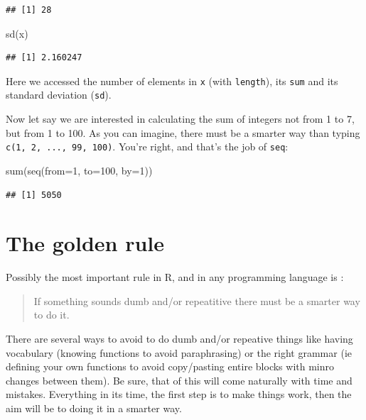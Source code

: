 \documentclass[
]{book}
\newenvironment{Shaded}{\begin{snugshade}}{\end{snugshade}}
\newcommand{\AttributeTok}[1]{\textcolor[rgb]{0.77,0.63,0.00}{#1}}
\newcommand{\DecValTok}[1]{\textcolor[rgb]{0.00,0.00,0.81}{#1}}
\newcommand{\FunctionTok}[1]{\textcolor[rgb]{0.00,0.00,0.00}{#1}}
\newcommand{\NormalTok}[1]{#1}
\begin{document}
\begin{verbatim}
## [1] 28
\end{verbatim}

\begin{Shaded}
\begin{Highlighting}[]
\FunctionTok{sd}\NormalTok{(x)}
\end{Highlighting}
\end{Shaded}

\begin{verbatim}
## [1] 2.160247
\end{verbatim}

Here we accessed the number of elements in \texttt{x} (with \texttt{length}), its \texttt{sum} and its standard deviation (\texttt{sd}).

Now let say we are interested in calculating the sum of integers not from 1 to 7, but from 1 to 100. As you can imagine, there must be a smarter way than typing \texttt{c(1,\ 2,\ ...,\ 99,\ 100)}. You're right, and that's the job of \texttt{seq}:

\begin{Shaded}
\begin{Highlighting}[]
\FunctionTok{sum}\NormalTok{(}\FunctionTok{seq}\NormalTok{(}\AttributeTok{from=}\DecValTok{1}\NormalTok{, }\AttributeTok{to=}\DecValTok{100}\NormalTok{, }\AttributeTok{by=}\DecValTok{1}\NormalTok{))}
\end{Highlighting}
\end{Shaded}

\begin{verbatim}
## [1] 5050
\end{verbatim}

\hypertarget{the-golden-rule}{%
\section{The golden rule}\label{the-golden-rule}}

Possibly the most important rule in R, and in any programming language is :

\begin{quote}
If something sounds dumb and/or repeatitive there must be a smarter way to do it.
\end{quote}

There are several ways to avoid to do dumb and/or repeative things like having vocabulary (knowing functions to avoid paraphrasing) or the right grammar (ie defining your own functions to avoid copy/pasting entire blocks with minro changes between them). Be sure, that of this will come naturally with time and mistakes. Everything in its time, the first step is to make things work, then the aim will be to doing it in a smarter way.
\end{document}
